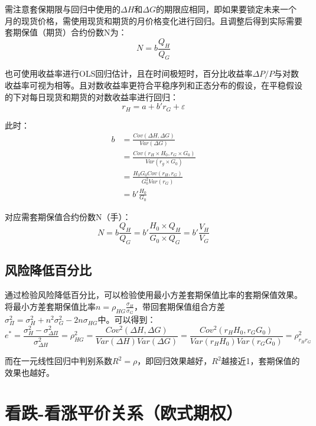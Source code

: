 \documentclass[11pt]{article}
\begin{document}
需注意套保期限与回归中使用的$\Delta H$和$\Delta G$的期限应相同，即如果要锁定未来一个月的现货价格，需使用现货和期货的月价格变化进行回归。且调整后得到实际需要套期保值（期货）合约份数N为：
\begin{equation*}
    N =  b \frac{Q_H}{Q_G}
\end{equation*}

也可使用收益率进行OLS回归估计，且在时间极短时，百分比收益率$\Delta P/P$与对数收益率可视为相等。且对数收益率更符合平稳序列和正态分布的假设，在平稳假设的下对每日现货和期货的对数收益率进行回归：
\begin{equation*}
    r_H = a + b'r_G + \varepsilon
\end{equation*}

此时：
\begin{align*}
    b &= \frac{Cov(\Delta H,\Delta G)}{Var(\Delta G)} \\ 
    &= \frac{Cov(r_H \times H_0,r_G \times G_0)}{Var(r_g \times G_0)} \\
    &= \frac{H_0G_0 Cov(r_H,r_G)}{G_0^2 Var(r_G)} \\
    &= b'\frac{H_0}{G_0}
\end{align*}

对应需套期保值合约份数N（手）：
\begin{equation*}
    N =  b\frac{Q_H}{Q_G} = b'\frac{H_0 \times Q_H}{G_0 \times Q_G} = b'\frac{V_H}{V_G}
\end{equation*}

\subsection{风险降低百分比}

通过检验风险降低百分比，可以检验使用最小方差套期保值比率的套期保值效果。将最小方差套期保值比率$n = \rho_{HG}\frac{\sigma_{H}}{\sigma_{G}}$，带回套期保值组合方差$\sigma_{\Pi}^2 = \sigma_H^2 + n^2\sigma_G^2 - 2n\sigma_{HG}$中。可以得到：
\begin{equation*}
    e^* = \frac{\sigma_{H}^2 - \sigma_{\Delta \Pi}^2}{\sigma_{\Delta H}^2} = \rho_{HG}^2
    =\frac{Cov^2(\Delta H, \Delta G)}{Var(\Delta H)Var(\Delta G)}
    =\frac{Cov^2(r_H H_0, r_G G_0)}{Var(r_H H_0)Var(r_G G_0)}
    =\rho_{r_Hr_G}^2
\end{equation*}

而在一元线性回归中判别系数$R^2=\rho$，即回归效果越好，$R^2$越接近1，套期保值的效果也越好。

\section{看跌-看涨平价关系（欧式期权）}
\end{document}
